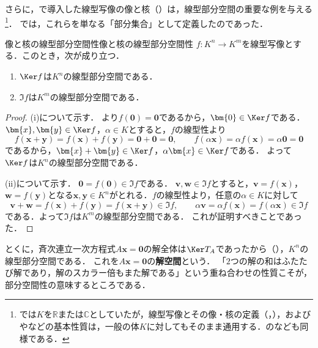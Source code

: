 さらに，で導入した線型写像の像と核（）は，線型部分空間の重要な例を与える\footnote{では$K$を$\mathbb{R}$または$\mathbb{C}$としていたが，線型写像とその像・核の定義（，），およびやなどの基本性質は，一般の体$K$に対してもそのまま通用する．のなども同様である．}．
では，これらを単なる「部分集合」として定義したのであった．

\begin{prop}{像と核の線型部分空間性}{像と核の線型部分空間性}
  $f \colon K^n \to K^m$を線型写像とする．このとき，次が成り立つ．
  \begin{enumerate}[label=(\roman*),leftmargin=3.2em]
    \item $\Ker f$は$K^n$の線型部分空間である．
    \item $\Im f$は$K^m$の線型部分空間である．
  \end{enumerate}
\end{prop}

\begin{tleftbar}
\begin{proof}
  (i)について示す．
  より$f(\bm{0}) = \bm{0}$であるから，$\bm{0} \in \Ker f$である．
  $\bm{x}, \bm{y} \in \Ker f$，$\alpha \in K$とすると，$f$の線型性より
  \[
    f(\bm{x} + \bm{y}) = f(\bm{x}) + f(\bm{y}) = \bm{0} + \bm{0} = \bm{0},
    \qquad
    f(\alpha\bm{x}) = \alpha f(\bm{x}) = \alpha\bm{0} = \bm{0}
  \]
  であるから，$\bm{x} + \bm{y} \in \Ker f$，$\alpha\bm{x} \in \Ker f$である．
  よって$\Ker f$は$K^n$の線型部分空間である．

  (ii)について示す．
  $\bm{0} = f(\bm{0}) \in \Im f$である．
  $\bm{v}, \bm{w} \in \Im f$とすると，$\bm{v} = f(\bm{x})$，$\bm{w} = f(\bm{y})$となる$\bm{x}, \bm{y} \in K^n$がとれる．$f$の線型性より，任意の$\alpha\in K$に対して
  \[
    \bm{v} + \bm{w} = f(\bm{x}) + f(\bm{y}) = f(\bm{x} + \bm{y}) \in \Im f,
    \qquad
    \alpha\bm{v} = \alpha f(\bm{x}) = f(\alpha\bm{x}) \in \Im f
  \]
  である．よって$\Im f$は$K^m$の線型部分空間である．
  これが証明すべきことであった．
\end{proof}
\end{tleftbar}

とくに，斉次連立一次方程式$A\bm{x} = \bm{0}$の解全体は$\Ker T_A$であったから（），$K^n$の線型部分空間である．
これを$A\bm{x} = \bm{0}$の\textbf{解空間}という．
「$2$つの解の和はふたたび解であり，解のスカラー倍もまた解である」という重ね合わせの性質こそが，部分空間性の意味するところである．

